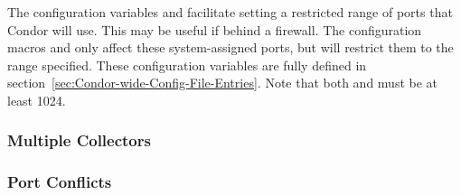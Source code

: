 The configuration variables
 and  facilitate setting a restricted
range of ports that Condor will use.
This may be useful if behind a firewall.
The configuration macros
 and  only affect these
system-assigned ports, but will restrict them to the range specified.
These configuration variables are fully defined
in section~\ref{sec:Condor-wide-Config-File-Entries}.
Note that both  and  must be at least 1024.

% 
%
% 
% 

\subsubsection{\label{sec:Ports-MultipleCollectors}Multiple Collectors}
\Todo


\subsubsection{\label{sec:Ports-Conflicts}Port Conflicts}
\Todo

